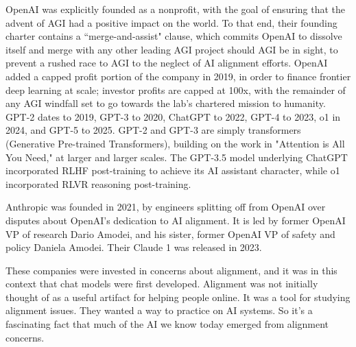 OpenAI was explicitly founded as a nonprofit, with the goal of ensuring that the advent of AGI had a positive impact on the world. To that end, their founding charter contains a ``merge-and-assist" clause, which commits OpenAI to dissolve itself and merge with any other leading AGI project should AGI be in sight, to prevent a rushed race to AGI to the neglect of AI alignment efforts. OpenAI added a capped profit portion of the company in 2019, in order to finance frontier deep learning at scale; investor profits are capped at 100x, with the remainder of any AGI windfall set to go towards the lab's chartered mission to humanity. GPT-2 dates to 2019, GPT-3 to 2020, ChatGPT to 2022, GPT-4 to 2023, o1 in 2024, and GPT-5 to 2025. GPT-2 and GPT-3 are simply transformers (Generative Pre-trained Transformers), building on the work in "Attention is All You Need," at larger and larger scales. The GPT-3.5 model underlying ChatGPT incorporated RLHF post-training to achieve its AI assistant character, while o1 incorporated RLVR reasoning post-training.

Anthropic was founded in 2021, by engineers splitting off from OpenAI over disputes about OpenAI's dedication to AI alignment. It is led by former OpenAI VP of research Dario Amodei, and his sister, former OpenAI VP of safety and policy Daniela Amodei. Their Claude 1 was released in 2023.

These companies were invested in concerns about alignment, and it was in this context that chat models were first developed. Alignment was not initially thought of as a useful artifact for helping people online. It was a tool for studying alignment issues. They wanted a way to practice on AI systems. So it's a fascinating fact that much of the AI we know today emerged from alignment concerns. %


